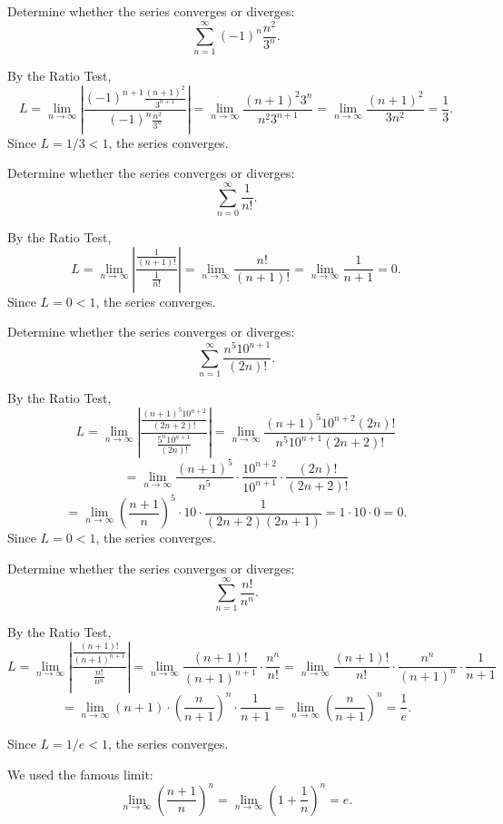\documentclass{ximera}
\begin{document}
\begin{example}[example 2]
Determine whether the series converges or diverges:
\[
\sum_{n=1}^\infty (-1)^n\frac{n^2}{3^n}.
\]

By the Ratio Test,
\[
L =  \lim_{n \to \infty} \left|\frac{(-1)^{n+1}\frac{(n+1)^2}{3^{n+1}}}{(-1)^n\frac{n^2}{3^n}}\right| =  \lim_{n \to \infty} \frac{(n+1)^2 3^n}{n^2 3^{n+1}} 
=  \lim_{n \to \infty} \frac{(n+1)^2}{3n^2} = \frac13.
\]
Since $L = 1/3 < 1$, the series converges.
\end{example}





\begin{example}[example 3]
Determine whether the series converges or diverges:
\[
\sum_{n=0}^\infty \frac{1}{n!}.
\]

By the Ratio Test,
\[
L =  \lim_{n \to \infty} \left|\frac{\frac{1}{(n+1)!}}{\frac{1}{n!}}\right| =  \lim_{n \to \infty} \frac{n!}{(n+1)!} =  \lim_{n \to \infty} \frac{1}{n+1} = 0.
\]
Since $L = 0 < 1$, the series converges.
\end{example}




\begin{example}[example 4]
Determine whether the series converges or diverges:
\[
\sum_{n=1}^\infty \frac{n^5 10^{n+1}}{(2n)!}.
\]

By the Ratio Test,
\[
L =  \lim_{n \to \infty} \left|\frac{\frac{(n+1)^5 10^{n+2}}{(2n+2)!}}{\frac{5^n 10^{n+1}}{(2n)!}}\right| 
=  \lim_{n \to \infty} \frac{(n+1)^5 10^{n+2}(2n)!}{n^5 10^{n+1}(2n+2)!}
\]
\[
 =  \lim_{n \to \infty} \frac{(n+1)^5}{n^5} \cdot \frac{10^{n+2}}{10^{n+1}} \cdot \frac{(2n)!}{(2n+2)!} 
 \]
 \[
 = 
  \lim_{n \to \infty} \left(\frac{n+1}{n}\right)^5 \cdot 10 \cdot \frac{1}{(2n+2)(2n+1)} = 1 \cdot 10 \cdot 0 = 0.
\]
Since $L = 0 < 1$, the series converges.
\end{example}




\begin{example}[example 5]
Determine whether the series converges or diverges:
\[
\sum_{n=1}^\infty \frac{n!}{n^n}.
\]


By the Ratio Test,
\[
L =  \lim_{n \to \infty} \left|\frac{\frac{(n+1)!}{(n+1)^{n+1}}}{\frac{n!}{n^n}}\right| = 
\lim_{n \to \infty} \frac{(n+1)!}{(n+1)^{n+1}}\cdot \frac{n^n}{n!}
=  \lim_{n \to \infty} \frac{(n+1)!}{n!} \cdot  \frac{n^n}{(n+1)^n}\cdot \frac{1}{n+1}
\]
\[
= \lim_{n \to \infty} (n+1) \cdot \left(\frac{n}{n+1}\right)^n \cdot \frac{1}{n+1} = \lim_{n \to \infty} \left(\frac{n}{n+1}\right)^n = \frac{1}{e}.
\]


Since $L = 1/e < 1$, the series converges.

\begin{remark}
We used the famous limit:
\[
\lim_{n \to \infty} \left(\frac{n+1}{n}\right)^n = \lim_{n \to \infty} \left(1 + \frac{1}{n}\right)^n = e.
\]
\end{remark}


\end{example}
\end{document}
